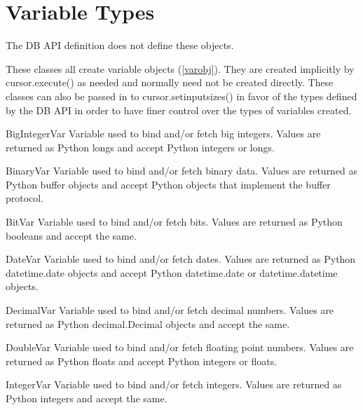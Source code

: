 \documentclass{manual}
\begin{document}
\section{Variable Types}\label{vartypes}

 The DB API definition does not define these objects.

These classes all create variable objects (\ref{varobj}). They are created
implicitly by cursor.execute() as needed and normally need not be created
directly. These classes can also be passed in to cursor.setinputsizes() in
favor of the types defined by the DB API in order to have finer control over
the types of variables created.

\begin{datadesc}{BigIntegerVar}
  Variable used to bind and/or fetch big integers. Values are returned as
  Python longs and accept Python integers or longs.
\end{datadesc}

\begin{datadesc}{BinaryVar}
  Variable used to bind and/or fetch binary data. Values are returned as Python
  buffer objects and accept Python objects that implement the buffer protocol.
\end{datadesc}

\begin{datadesc}{BitVar}
  Variable used to bind and/or fetch bits. Values are returned as Python
  booleans and accept the same.
\end{datadesc}

\begin{datadesc}{DateVar}
  Variable used to bind and/or fetch dates. Values are returned as Python
  datetime.date objects and accept Python datetime.date or datetime.datetime
  objects.
\end{datadesc}

\begin{datadesc}{DecimalVar}
  Variable used to bind and/or fetch decimal numbers. Values are returned as
  Python decimal.Decimal objects and accept the same.
\end{datadesc}

\begin{datadesc}{DoubleVar}
  Variable used to bind and/or fetch floating point numbers. Values are
  returned as Python floats and accept Python integers or floats.
\end{datadesc}

\begin{datadesc}{IntegerVar}
  Variable used to bind and/or fetch integers. Values are returned as Python
  integers and accept the same.
\end{datadesc}
\end{document}
